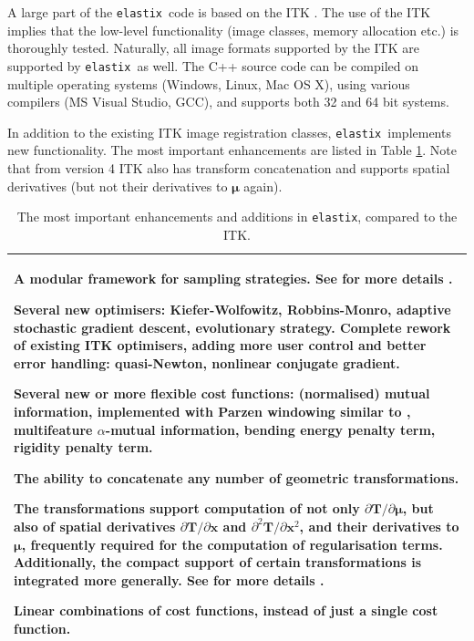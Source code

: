 \documentclass[]{report}
\newcommand{\elastix}{\texttt{elastix}}
\newcommand{\vx}{\bm{x}}
\newcommand{\vmu}{\bm{\mu}}
\newcommand{\vT}{\bm{T}}
\begin{document}
A large part of the \elastix\ code is based on the ITK
\cite{ITKSoftwareGuideSecondEdition}. The use of the ITK implies
that the low-level functionality (image classes, memory allocation
etc.) is thoroughly tested. Naturally, all image formats supported
by the ITK are supported by \elastix\ as well. The C++ source code
can be compiled on multiple operating systems (Windows, Linux, Mac
OS X), using various compilers (MS Visual Studio, GCC), and supports
both 32 and 64 bit systems.

In addition to the existing ITK image registration classes,
\elastix\ implements new functionality. The most important
enhancements are listed in Table \ref{table:extras}. Note that from
version 4 ITK also has transform concatenation and supports spatial
derivatives (but not their derivatives to $\vmu$ again).

\begin{table}[!h]
\centering
\begin{tabular}{p{30pc}}
\toprule \toprule
\begin{list}{}{\leftmargin=1em}
\item A modular framework for sampling strategies. See for more details \cite{StaringKlein2010b}.

\item Several new optimisers: Kiefer-Wolfowitz, Robbins-Monro, adaptive
    stochastic gradient descent, evolutionary strategy. Complete rework
    of existing ITK optimisers, adding more user control and
    better error handling: quasi-Newton, nonlinear conjugate gradient.

\item Several new or more flexible cost functions: (normalised) mutual
    information, implemented with Parzen windowing similar to
    \cite{ThevenazEA00a}, multifeature $\alpha$-mutual information, bending
    energy penalty term, rigidity penalty term.

\item The ability to concatenate any number of geometric transformations.

\item The transformations support computation of not only $\partial \vT /
    \partial \vmu$, but also of spatial derivatives $\partial \vT / \partial
    \vx$ and $\partial^2 \vT / \partial \vx^2$, and their derivatives to
    $\vmu$, frequently required for the computation of regularisation terms.
    Additionally, the compact support of certain transformations is integrated
    more generally. See for more details \cite{StaringKlein2010a}.

\item Linear combinations of cost functions, instead of just a single cost
    function.

\end{list}\\
 \bottomrule \bottomrule
\end{tabular}
\caption{The most important enhancements and additions in \elastix, compared to
the ITK.}\label{table:extras}
\end{table}
\end{document}
